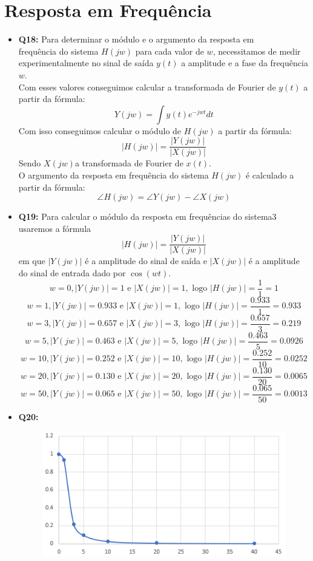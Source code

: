 \documentclass[a4paper, 12pt]{article}
\begin{document}
\section{Resposta em Frequência}
\begin{itemize}
    \item \textbf{Q18:} Para determinar o módulo e o argumento da resposta em\\
          frequência do sistema $H(jw)$ para cada valor de $w$, necessitamos de medir experimentalmente no sinal de saída $y(t)$ a amplitude e a fase da frequência $w$.\\
          Com esses valores conseguimos calcular a transformada de Fourier de $y(t)$ a partir da fórmula:
          \[Y(jw) = \int y(t)e^{-jwt}dt\]
          Com isso conseguimos calcular o módulo de $H(jw)$ a partir da fórmula:
          \[ |H(jw)| = \frac{ |Y(jw)| }{ |X(jw)| }\]
          Sendo $X(jw)$a transformada de Fourier de $x(t)$.\\
          O argumento da resposta em frequência do sistema $H(jw)$ é calculado a partir da fórmula:
          \[\angle H(jw) = \angle Y(jw) - \angle X(jw)\]
    \item \textbf{Q19:} Para calcular o módulo da resposta em frequências do sistema3 usaremos a fórmula
          \[ |H(jw)| = \frac{ |Y(jw)| }{ |X(jw)| }\]
          em que $|Y(jw)|$ é a amplitude do sinal de saída e $|X(jw)|$ é a amplitude do sinal de entrada dado por $\cos(wt)$.\vspace{15px}
          \[w = 0, |Y(jw)| = 1 \textrm{ e } |X(jw)| = 1, \textrm{ logo } |H(jw)| = \frac{1}{1} = 1\]
          \[w = 1, |Y(jw)| = 0.933 \textrm{ e } |X(jw)| = 1, \textrm{ logo } |H(jw)| = \frac{0.933}{1} = 0.933\]
          \[w = 3, |Y(jw)| = 0.657 \textrm{ e } |X(jw)| = 3, \textrm{ logo } |H(jw)| = \frac{0.657}{3} = 0.219\]
          \[w = 5, |Y(jw)| = 0.463 \textrm{ e } |X(jw)| = 5, \textrm{ logo } |H(jw)| = \frac{0.463}{5} = 0.0926\]
          \[w = 10, |Y(jw)| = 0.252 \textrm{ e } |X(jw)| = 10, \textrm{ logo } |H(jw)| = \frac{0.252}{10} = 0.0252\]
          \[w = 20, |Y(jw)| = 0.130 \textrm{ e } |X(jw)| = 20, \textrm{ logo } |H(jw)| = \frac{0.130}{20} = 0.0065\]
          \[w = 50, |Y(jw)| = 0.065 \textrm{ e } |X(jw)| = 50, \textrm{ logo } |H(jw)| = \frac{0.065}{50} = 0.0013\]
    \item \textbf{Q20:}
          \begin{figure}[!ht]
              \includegraphics[width = 13.5cm]{images/Graf4.png}

\end{figure}
\end{itemize}
\end{document}
